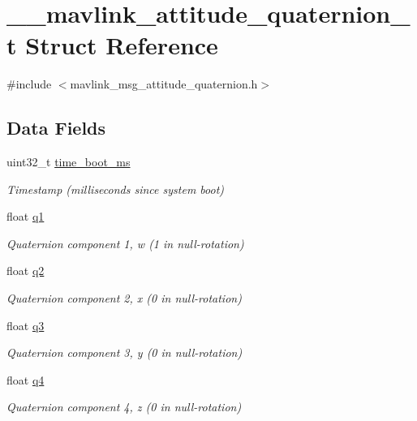 \hypertarget{struct____mavlink__attitude__quaternion__t}{\section{\+\_\+\+\_\+mavlink\+\_\+attitude\+\_\+quaternion\+\_\+t Struct Reference}
\label{struct____mavlink__attitude__quaternion__t}
}


{\ttfamily \#include $<$mavlink\+\_\+msg\+\_\+attitude\+\_\+quaternion.\+h$>$}

\subsection*{Data Fields}
\begin{DoxyCompactItemize}
\item 
uint32\+\_\+t \hyperlink{struct____mavlink__attitude__quaternion__t_af6846c94b303788cf54d7861a939ab15}{time\+\_\+boot\+\_\+ms}
\begin{DoxyCompactList}\small\item\em Timestamp (milliseconds since system boot) \end{DoxyCompactList}\item 
float \hyperlink{struct____mavlink__attitude__quaternion__t_a54fd7b1cca2ab5e1b800bef5c7014b17}{q1}
\begin{DoxyCompactList}\small\item\em Quaternion component 1, w (1 in null-\/rotation) \end{DoxyCompactList}\item 
float \hyperlink{struct____mavlink__attitude__quaternion__t_ad6451d99fa8f80bba96a47b3c2408255}{q2}
\begin{DoxyCompactList}\small\item\em Quaternion component 2, x (0 in null-\/rotation) \end{DoxyCompactList}\item 
float \hyperlink{struct____mavlink__attitude__quaternion__t_a6ea5423090526626cf04041c929703d5}{q3}
\begin{DoxyCompactList}\small\item\em Quaternion component 3, y (0 in null-\/rotation) \end{DoxyCompactList}\item 
float \hyperlink{struct____mavlink__attitude__quaternion__t_a4c78a9e744406f980fab7ff67613b14d}{q4}
\begin{DoxyCompactList}\small\item\em Quaternion component 4, z (0 in null-\/rotation) \end{DoxyCompactList}\item 

\end{DoxyCompactItemize}
